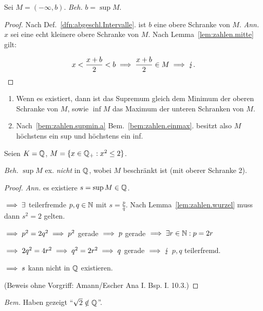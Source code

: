 \documentclass[12pt]{scrreprt}
\begin{document}
\begin{bsp} Sei $M=(-\infty,b)$. \emph{Beh.} $b=\sup M$.
\begin{proof} Nach Def.~\ref{dfn:abgeschl.Intervalle}. ist $b$ eine obere Schranke von $M$. \emph{Ann.} $x$ sei eine echt kleinere obere Schranke von $M$. Nach Lemma~\ref{lem:zahlen.mitte} gilt:

\[\displaystyle x < \frac{x+b}{2} < b\implies\frac{x+b}{2}\in M\implies\lightning.\]
\end{proof}
\end{bsp}

\begin{bem}\label{bem:zahlen.supmin}
\begin{enumerate}%
\item\label{bem:zahlen.supmin.a} Wenn es existiert, dann ist das Supremum gleich dem Minimum der oberen Schranke von $M$, sowie $\inf M$ das Maximum der unteren Schranken von $M$.

\item Nach~\ref{bem:zahlen.supmin.a} Bem.~\ref{bem:zahlen.einmax}. besitzt also $M$ höchstens ein sup und höchstens ein inf.
\end{enumerate}
\end{bem}

\begin{bsp}\label{bsp:zahlen.wurzelzwei}
Seien $K = \mathbb{Q}$, $M = \{x\in\mathbb{Q}_+: x^2 \leq 2\}$.

\emph{Beh.} $\sup M$ ex. \emph{nicht} in $\mathbb{Q}$, wobei $M$ beschränkt ist (mit oberer Schranke 2).
\begin{proof}\emph{Ann.} es existiere $s = \sup M\in\mathbb{Q}$.

$\implies \exists$ teilerfremde $p,q\in\mathbb{N}$ mit $\displaystyle s=\frac{p}{q}$. Nach Lemma~\ref{lem:zahlen.wurzel} muss dann $s^2 = 2$ gelten.

$\implies p^2 = 2q^2\implies p^2$ gerade $\implies p$ gerade $\implies\exists r\in\mathbb{N}: p = 2r$

$\implies 2q^2 = 4r^2\implies q^2=2r^2\implies q$ gerade $\implies\lightning$ $p,q$ teilerfremd.

$\implies s$ kann nicht in $\mathbb{Q}$ existieren.

(Beweis ohne Vorgriff: Amann/Escher Ana I. Bsp. I. 10.3.)
\end{proof}

\emph{Bem.} Haben gezeigt "`$\sqrt{2}\notin\mathbb{Q}$"'.
\end{bsp}
\end{document}
